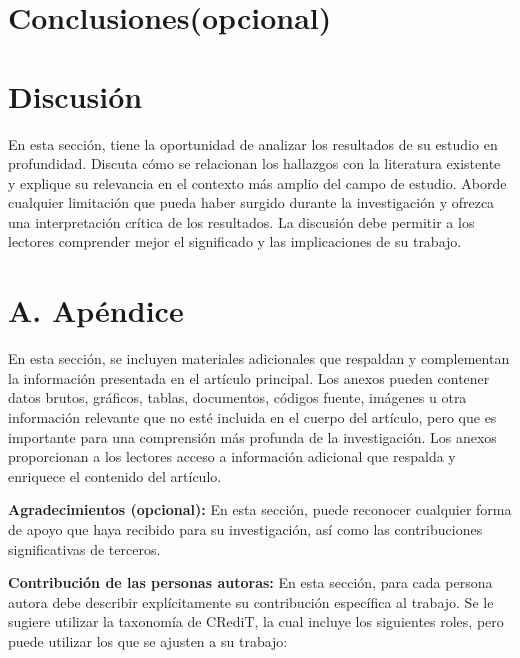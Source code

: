 \documentclass[fleqn]{Paquetes/RevDigMatEduInt}
\begin{document}
\section{Conclusiones(opcional)} \label{sec:conclusiones}

\section{Discusión} \label{sec:discusion}
En esta sección, tiene la oportunidad de analizar los resultados de su estudio en profundidad. Discuta cómo se relacionan los hallazgos con la literatura existente y explique su relevancia en el contexto más amplio del campo de estudio. Aborde cualquier limitación que pueda haber surgido durante la investigación y ofrezca una interpretación crítica de los resultados. La discusión debe permitir a los lectores comprender mejor el significado y las implicaciones de su trabajo.


\section*{A. Apéndice}


En esta sección, se incluyen materiales adicionales que respaldan y complementan la información presentada en el artículo principal. Los anexos pueden contener datos brutos, gráficos, tablas, documentos, códigos fuente, imágenes u otra información relevante que no esté incluida en el cuerpo del artículo, pero que es importante para una comprensión más profunda de la investigación. Los anexos proporcionan a los lectores acceso a información adicional que respalda y enriquece el contenido del artículo.

{\bf \color{azulTitulos}Agradecimientos (opcional):} En esta sección, puede reconocer cualquier forma de apoyo que haya recibido para su investigación, así como las contribuciones significativas de terceros. 

{\bf \color{azulTitulos}Contribución de las personas autoras:} En esta sección, para cada persona autora debe describir explícitamente su contribución específica al trabajo. Se le sugiere utilizar la taxonomía de CRediT, la cual incluye los siguientes roles, pero puede utilizar los que se ajusten a su trabajo:
\end{document}
